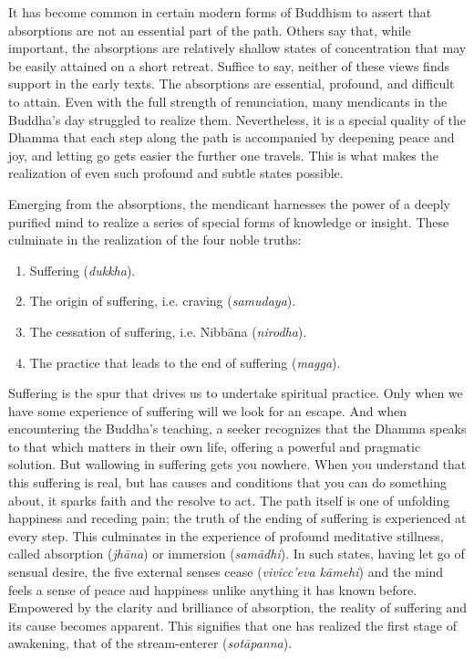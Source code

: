 \documentclass[12pt,openany]{book}%
\begin{document}
It has become common in certain modern forms of Buddhism to assert that absorptions are not an essential part of the path. Others say that, while important, the absorptions are relatively shallow states of concentration that may be easily attained on a short retreat. Suffice to say, neither of these views finds support in the early texts. The absorptions are essential, profound, and difficult to attain. Even with the full strength of renunciation, many mendicants in the Buddha’s day struggled to realize them. Nevertheless, it is a special quality of the Dhamma that each step along the path is accompanied by deepening peace and joy, and letting go gets easier the further one travels. This is what makes the realization of even such profound and subtle states possible.

Emerging from the absorptions, the mendicant harnesses the power of a deeply purified mind to realize a series of special forms of knowledge or insight. These culminate in the realization of the four noble truths:

\begin{enumerate}%
\item Suffering (\textit{dukkha}).%
\item The origin of suffering, i.e. craving (\textit{samudaya}).%
\item The cessation of suffering, i.e. \textsanskrit{Nibbāna} (\textit{nirodha}).%
\item The practice that leads to the end of suffering (\textit{magga}).%
\end{enumerate}

Suffering is the spur that drives us to undertake spiritual practice. Only when we have some experience of suffering will we look for an escape. And when encountering the Buddha’s teaching, a seeker recognizes that the Dhamma speaks to that which matters in their own life, offering a powerful and pragmatic solution. But wallowing in suffering gets you nowhere. When you understand that this suffering is real, but has causes and conditions that you can do something about, it sparks faith and the resolve to act. The path itself is one of unfolding happiness and receding pain; the truth of the ending of suffering is experienced at every step. This culminates in the experience of profound meditative stillness, called absorption (\textit{\textsanskrit{jhāna}}) or immersion (\textit{\textsanskrit{samādhi}}). In such states, having let go of sensual desire, the five external senses cease (\textit{vivicc’eva \textsanskrit{kāmehi}}) and the mind feels a sense of peace and happiness unlike anything it has known before. Empowered by the clarity and brilliance of absorption, the reality of suffering and its cause becomes apparent. This signifies that one has realized the first stage of awakening, that of the stream-enterer (\textit{\textsanskrit{sotāpanna}}).
\end{document}
